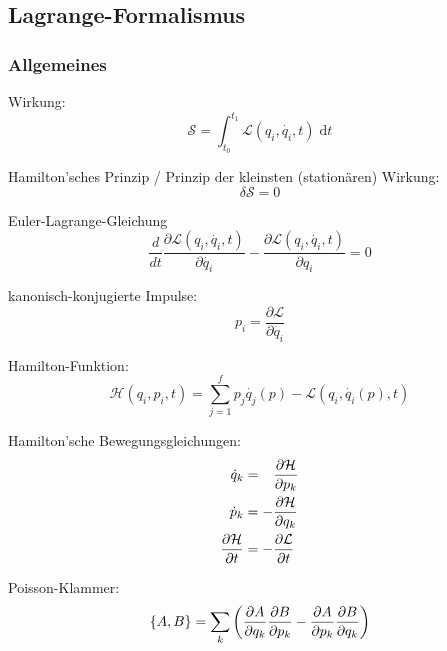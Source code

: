 \documentclass[11pt]{article}
\numberwithin{equation}{section}
\begin{document}
    \subsection{Lagrange-Formalismus}
      \subsubsection{Allgemeines}
        Wirkung:
        \begin{equation}
          \mathcal{S}=\int_{t_0}^{t_1}\mathcal{L}(q_i, \dot{q_i},t)\;\mathrm{d} t
        \end{equation}

        Hamilton'sches Prinzip / Prinzip der kleinsten (stationären) Wirkung:
        \begin{equation}
          \delta \mathcal{S}=0
        \end{equation}

        Euler-Lagrange-Gleichung
        \begin{equation}
           \frac{d}{dt} \frac{\partial \mathcal{L}(q_{i},\dot{q_{i}},t)}{\partial \dot{q_{i}}} - \frac{\partial \mathcal{L}(q_{i},\dot{q_{i}},t)}{\partial q_{i}} = 0
        \end{equation}

        kanonisch-konjugierte Impulse:
        \begin{equation}
          p_i=\frac{\partial \mathcal{L}}{\partial\dot{q_i}}
        \end{equation}

        Hamilton-Funktion:
        \begin{equation}
          \mathcal{H}(q_i,p_i,t)=\sum_{j=1}^{f}p_j\dot{q_j}(p) - \mathcal{L}(q_i, \dot{q_i}(p),t)
        \end{equation}

        Hamilton'sche Bewegungsgleichungen:
        \begin{equation}
          \begin{aligned}
            \dot{q}_k &= \phantom{-}\frac{\partial \mathcal{H}}{\partial p_k} \\
            \dot{p}_k &= -\frac{\partial \mathcal{H}}{\partial q_k} \\
            \frac{\partial \mathcal{H}}{\partial t} &= -\frac{\partial \mathcal{L}}{\partial t} \\
          \end{aligned}
        \end{equation}

        Poisson-Klammer:
        \begin{equation}
          \lbrace A, B \rbrace = \sum_k \left(
            \frac{\partial A}{\partial q_k}\frac{\partial B}{\partial p_k} - \frac{\partial A}{\partial p_k}\frac{\partial B}{\partial q_k}
          \right)
        \end{equation}
\end{document}
